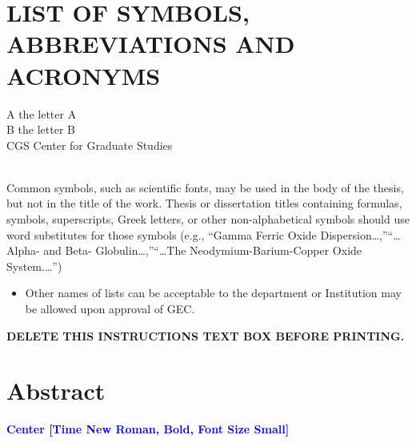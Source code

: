 \documentclass[a4paper,12pt,one side]{report}
\theoremstyle{definition}
\begin{document}
\chapter*{LIST OF SYMBOLS, ABBREVIATIONS AND ACRONYMS}
A	the letter A\\
B	the letter B\\
CGS	Center for Graduate Studies\\~\\

\begin{tcolorbox}[enhanced jigsaw,
    sharp corners,
    boxrule=0.5pt, 
    colback=blue!30!white,   
    borderline={0.5pt}{-2pt}{black,solid} %
 ]
 \begin{justify}
Common symbols, such as scientific fonts, may be used in the body of the thesis, but not in the title of the work. Thesis or dissertation titles containing formulas, symbols, superscripts, Greek letters, or other non-alphabetical symbols should use word substitutes for those symbols (e.g., “Gamma Ferric Oxide Dispersion…,”“…Alpha- and Beta-  Globulin…,”“…The Neodymium-Barium-Copper Oxide System.…”)
\begin{itemize}
    \item Other names of lists can be acceptable to the department or Institution may be allowed upon approval of GEC.
\end{itemize}
{\bf DELETE THIS INSTRUCTIONS TEXT BOX BEFORE PRINTING.}
 \end{justify}
\end{tcolorbox}
\newpage
{}
\chapter*{Abstract}
\begin{center}
    {\small \bf \textcolor{blue}{Center [Time New Roman, Bold, Font Size Small]}}\\
\end{center}
\end{document}

